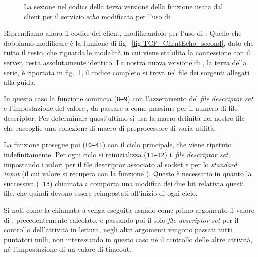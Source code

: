 \begin{figure}[!htb]
  \footnotesize \centering
  \begin{minipage}[c]{\codesamplewidth}
  \end{minipage} 
  \normalsize
  \caption{La sezione nel codice della terza versione della funzione
     usata dal client per il servizio \textit{echo}
    modificata per l'uso di .}
  \label{fig:TCP_ClientEcho_third}
\end{figure}

Riprendiamo allora il codice del client, modificandolo per l'uso di
. Quello che dobbiamo modificare è la funzione 
di fig.~\ref{fig:TCP_ClientEcho_second}, dato che tutto il resto, che riguarda
le modalità in cui viene stabilita la connessione con il server, resta
assolutamente identico. La nostra nuova versione di , la
terza della serie, è riportata in fig.~\ref{fig:TCP_ClientEcho_third}, il
codice completo si trova nel file  dei sorgenti
allegati alla guida.

In questo caso la funzione comincia (\texttt{\small 8--9}) con l'azzeramento
del \textit{file descriptor set}  e l'impostazione del valore
, da passare a  come massimo per il numero di file
descriptor. Per determinare quest'ultimo si usa la macro  definita
nel nostro file  che raccoglie una collezione di macro di
preprocessore di varia utilità.

La funzione prosegue poi (\texttt{\small 10--41}) con il ciclo principale, che
viene ripetuto indefinitamente. Per ogni ciclo si reinizializza
(\texttt{\small 11--12}) il \textit{file descriptor set}, impostando i valori
per il file descriptor associato al socket  e per lo
\textit{standard input} (il cui valore si recupera con la funzione
). Questo è necessario in quanto la successiva (\texttt{\small
  13}) chiamata a  comporta una modifica dei due bit relativia
questi file, che quindi devono essere reimpostati all'inizio di ogni ciclo.

Si noti come la chiamata a  venga eseguita usando come primo
argomento il valore di , precedentemente calcolato, e passando poi
il solo \textit{file descriptor set} per il controllo dell'attività in
lettura, negli altri argomenti vengono passati tutti puntatori nulli, non
interessando in questo caso né il controllo delle altre attività, né
l'impostazione di un valore di timeout.

